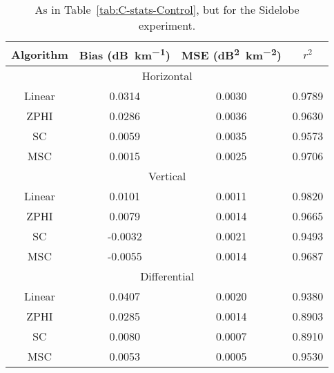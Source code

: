 \begin{table}
    \centering
    \begin{tabular}{| c | c | c | c |}
        \hline
        Algorithm & Bias (\si{dB\per \kilo\meter}) & MSE (\si{dB\squared \per \kilo\meter \squared}) & $r^2$ \\
        \hline
        \hline
        \multicolumn{4}{|c|}{Horizontal}\\
        \hline
        Linear & 0.0314 & 0.0030 & 0.9789\\
        ZPHI & 0.0286 & 0.0036 & 0.9630\\
        SC & 0.0059 & 0.0035 & 0.9573\\
        MSC & 0.0015 & 0.0025 & 0.9706\\
        \hline
        \multicolumn{4}{|c|}{Vertical}\\
        \hline
        Linear & 0.0101 & 0.0011 & 0.9820\\
        ZPHI & 0.0079 & 0.0014 & 0.9665\\
        SC & -0.0032 & 0.0021 & 0.9493\\
        MSC & -0.0055 & 0.0014 & 0.9687\\
        \hline
        \multicolumn{4}{|c|}{Differential}\\
        \hline
        Linear & 0.0407 & 0.0020 & 0.9380\\
        ZPHI & 0.0285 & 0.0014 & 0.8903\\
        SC & 0.0080 & 0.0007 & 0.8910\\
        MSC & 0.0053 & 0.0005 & 0.9530\\
\hline
    \end{tabular}
    \caption{As in Table~\ref{tab:C-stats-Control}, but for
    the Sidelobe experiment.}
    \label{tab:C-stats-Sidelobe}
\end{table}
